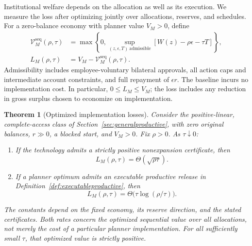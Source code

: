 \documentclass[ecta,draft]{econsocart}
\newtheorem{theorem}{Theorem}
\theoremstyle{definition}
\theoremstyle{definition}
\begin{document}
Institutional welfare depends on the allocation as well as its execution.
We measure the loss after optimizing jointly over allocations, reserves,
and schedules.
For a zero-balance economy with planner value $V_M>0$, define
\[
 \begin{aligned}
 \mathcal V_M^{\mathrm{seq}}(\rho,\tau)
 &=\max\left\{0,\sup_{(z,\epsilon,T)\ \mathrm{admissible}}
       [W(z)-\rho\epsilon-\tau T]\right\},\\
 L_M(\rho,\tau)&=V_M-\mathcal V_M^{\mathrm{seq}}(\rho,\tau).
 \end{aligned}
\]
Admissibility includes employee-voluntary bilateral approvals, all action
caps and intermediate account constraints, and full repayment of
$\epsilon r$. The baseline incurs no implementation cost. In particular,
$0\leq L_M\leq V_M$; the loss includes any reduction in gross surplus
chosen to economize on implementation.

\begin{theorem}[Optimized implementation losses]
\label{thm:optimizedloss}
Consider the positive-linear, complete-access class of
Section~\ref{sec:generalproductive}, with zero original balances,
$r\gg0$, a blocked start, and $V_M>0$. Fix $\rho>0$.
As $\tau\downarrow0$:
\begin{enumerate}
 \item If the technology admits a strictly positive nonexpansion
 certificate, then
 \[
       L_M(\rho,\tau)=\Theta(\sqrt{\rho\tau}).
 \]
 \item If a planner optimum admits an executable productive release
 in Definition~\ref{def:executableproductive}, then
 \[
       L_M(\rho,\tau)=\Theta\bigl(\tau\log(\rho/\tau)\bigr).
 \]
\end{enumerate}
The constants depend on the fixed economy, its reserve direction, and
the stated certificates. Both rates concern the optimized sequential
value over all allocations, not merely the cost of a particular planner
implementation. For all sufficiently small $\tau$, that optimized value
is strictly positive.
\end{theorem}
\end{document}
